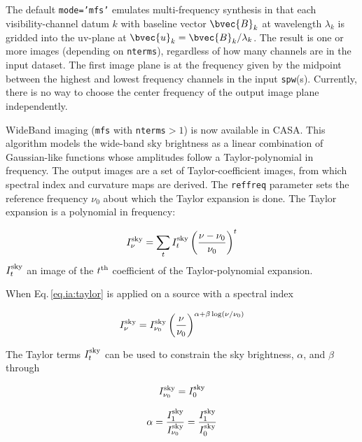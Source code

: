 The default {\tt mode='mfs'} emulates multi-frequency synthesis in
that each visibility-channel datum $k$ with baseline vector
$\bvec{B}_k$ at wavelength $\lambda_k$ is gridded into the uv-plane at
$\bvec{u}_k = \bvec{B}_k/\lambda_k$.  The result is one or more images
(depending on {\tt nterms}), regardless of how many channels are in the input dataset.
The first image plane is at the frequency given by the midpoint between
the highest and lowest frequency channels in the input {\tt spw}(s).
Currently, there is no way to choose the center frequency of the 
output image plane independently.

WideBand imaging ({\tt mfs} with {\tt nterms}$>1$) is now available in
CASA. This algorithm models the wide-band sky brightness as a linear
combination of Gaussian-like functions whose amplitudes follow a
Taylor-polynomial in frequency.  The output images are a set of
Taylor-coefficient images, from which spectral index and curvature
maps are derived. The {\tt reffreq} parameter sets the reference
frequency $\nu_0$ about which the Taylor expansion is done. The Taylor
expansion is a polynomial in frequency:

\begin{equation}
I_{\nu}^{\rm sky}=\sum_{t} I_{t}^{\rm sky} \left(\frac{\nu-\nu_0}{\nu_0}\right)^t
\label{eq.ia:taylor}
\end{equation}
$I_{t}^{\rm sky}$ an image of the $t^{\rm th}$
coefficient of the Taylor-polynomial expansion.

When Eq.\,\ref{eq.ia:taylor} is applied on a source with a spectral index

\begin{equation}
I_{\nu}^{\rm sky}=I_{\nu_0}^{\rm sky} \left(\frac{\nu}{\nu_0}\right)^{\alpha + \beta \log(\nu/\nu_0)}
\label{eq.ia:specindex}
\end{equation}

The Taylor terms $I_{t}^{\rm sky}$ can be used to constrain the sky
brightness, $\alpha$, and $\beta$ through

\begin{equation}
I_{\nu_0}^{\rm sky}=I_{0}^{\rm sky}
\label{eq.ia:taylorsky}
\end{equation}

\begin{equation}
\alpha= \frac{I_1^{\rm sky}}{I_{\nu_0}^{\rm sky}}=\frac{I_1^{\rm sky}}{I_{0}^{\rm sky}} \\
\label{eq.ia:tayloralpha}
\end{equation}

